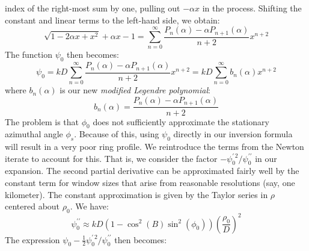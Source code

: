 \documentclass{article}
\theoremstyle{plain}
\begin{document}
        index of the right-most sum by one, pulling out $-\alpha{x}$
        in the process. Shifting the constant and linear terms to
        the left-hand side, we obtain:
        \begin{equation}
            \sqrt{1-2\alpha{x}+x^{2}}+\alpha{x}-1
            =\sum_{n=0}^{\infty}
                \frac{P_{n}(\alpha)-\alpha{P}_{n+1}(\alpha)}{n+2}x^{n+2}
        \end{equation}
        The function $\psi_{0}$ then becomes:
        \begin{equation}
            \psi_{0}
            =kD\sum_{n=0}^{\infty}
                \frac{P_{n}(\alpha)-\alpha{P}_{n+1}(\alpha)}{n+2}x^{n+2}
            =kD\sum_{n=0}^{\infty}
                b_{n}(\alpha)x^{n+2}
        \end{equation}
        where $b_{n}(\alpha)$ is our new
        \textit{modified Legendre polynomial}:
        \begin{equation}
            b_{n}(\alpha)=\frac{P_{n}(\alpha)-\alpha{P}_{n+1}(\alpha)}{n+2}
        \end{equation}
        The problem is that $\phi_{0}$ does not sufficiently approximate the
        stationary azimuthal angle $\phi_{s}$. Because of this, using
        $\psi_{0}$ directly in our inversion formula will result in a
        very poor ring profile. We reintroduce the terms from the Newton
        iterate to account for this. That is, we consider the
        factor $-\psi^{\prime\,2}_{0}/\psi^{\prime\prime}_{0}$ in our
        expansion. The second partial
        derivative can be approximated fairly well by the constant term
        for window sizes that arise from reasonable resolutions
        (say, one kilometer). The constant approximation is given by the
        Taylor series in $\rho$ centered about $\rho_{0}$. We have:
        \begin{equation}
            \psi^{\prime\prime}_{0}
            \approx{kD}\left(1-\cos^{2}(B)\sin^{2}(\phi_{0})\right)\left(
                \frac{\rho_{0}}{D}
            \right)^{2}
        \end{equation}
        The expression
        $\psi_{0}-\frac{1}{2}\psi^{\prime\,2}_{0}/\psi^{\prime\prime}_{0}$
        then becomes:
\end{document}
